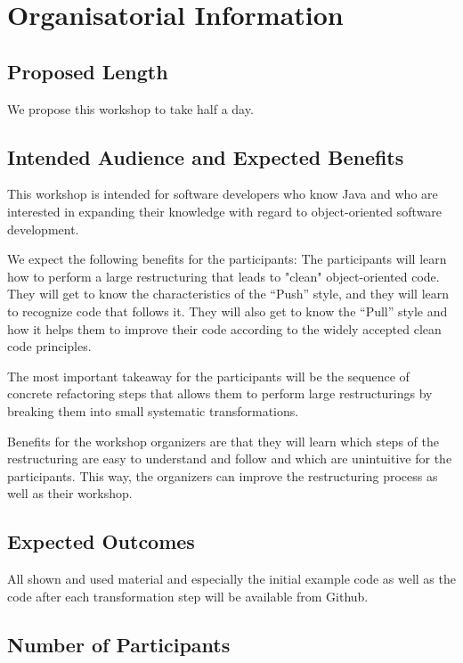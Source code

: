\documentclass[a4,11pt]{article}
\begin{document}
\section*{Organisatorial Information}

\subsection*{Proposed Length}
We propose this workshop to take half a day. 

\subsection*{Intended Audience and Expected Benefits}

This workshop is intended for software developers who know Java and who are interested in expanding their knowledge with regard to object-oriented software development.

We expect the following benefits for the participants: 
The participants will learn how to perform a large restructuring that leads to "clean" object-oriented code. 
They will get to know the characteristics of the ``Push'' style, and they will learn to recognize code that follows it. 
They will also get to know the ``Pull'' style and how it helps them to improve their code according to the widely accepted clean code principles.

The most important takeaway for the participants will be the sequence of concrete refactoring steps that allows them to perform large restructurings by breaking them into small systematic transformations.

Benefits for the workshop organizers are that they will learn which steps of the restructuring are easy to understand and follow and which are unintuitive for the participants. This way, the organizers can improve the  restructuring process as well as their workshop.

\subsection*{Expected Outcomes}

All shown and used material and especially the initial example code as well as the code after each transformation step will be available from Github.

\subsection*{Number of Participants}
\end{document}
